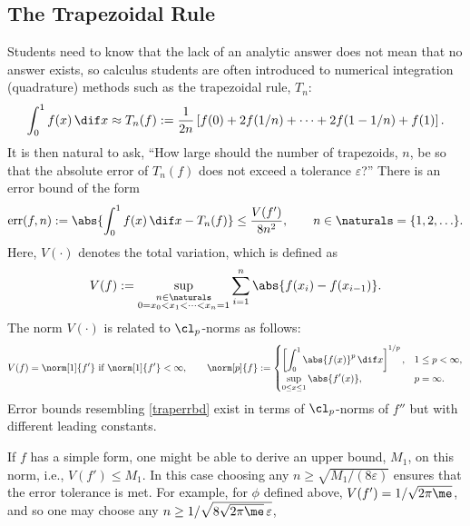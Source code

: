 \documentclass[]{amsart}
\DeclareMathOperator{\err}{err}
\theoremstyle{definition}
\theoremstyle{remark}
\begin{document}
\subsection{The Trapezoidal Rule}
Students need to know that the lack of an analytic answer does not mean that no answer exists, so calculus students are often introduced to numerical integration (quadrature) methods such as the trapezoidal rule, $T_n$:
\begin{equation}
\int_0^1 f(x) \, \dif x \approx T_n(f) := \frac{1}{2n} \left [ f(0) + 2 f(1/n) + \cdots + 2 f(1-1/n) + f(1) \right].
\end{equation}
It is then natural to ask, ``How large should the number of trapezoids, $n$, be so that the absolute error of $T_n(f)$ does not exceed a tolerance $\varepsilon$?''  There is an error bound of the form
\begin{equation} \label{traperrbd}
\err(f,n) := \abs{\int_0^1 f(x) \, \dif x - T_n(f)} \le \frac{V(f')}{8n^2}, \qquad n \in \naturals = \{1, 2, \ldots \}. 
\end{equation}
Here, $V(\cdot)$ denotes the total variation, which is defined as
\begin{equation} \label{vardef}
V(f) := \sup_{\substack{n \in \naturals\\ 0 = x_0 < x_1 < \cdots < x_{n} =1}} \sum_{i=1}^n \abs{f(x_i)-f(x_{i-1})}.
\end{equation}
The norm $V(\cdot)$ is related to $\cl_p$-norms as follows:
\begin{equation}
V(f)= \norm[1]{f'} \text{ if } \norm[1]{f'}< \infty, \qquad 
\norm[p]{f}:= \begin{cases} \displaystyle \left[\int_0^1 \abs{f(x)}^p \, \dif x \right]^{1/p}, & 1 \le p < \infty,\\[1ex]
\displaystyle  \sup_{0 \le x \le 1} \abs{f'(x)}, & p=\infty.
\end{cases}
\end{equation}
Error bounds resembling \eqref{traperrbd} exist in terms of $\cl_p$-norms of $f''$ but with different leading constants.  

If $f$ has a simple form, one might be able to derive an upper bound, $M_1$, on this norm, i.e., $V(f') \le M_1$.  In this case choosing any $n \ge \sqrt{M_1/(8\varepsilon)}$ ensures that the error tolerance is met. For example, for $\phi$ defined above, $V(f')=1/\sqrt{2 \pi \me}$, and so one may choose any $n \ge 1/\sqrt{8\sqrt{2 \pi \me} \, \varepsilon}$,

\end{document}

